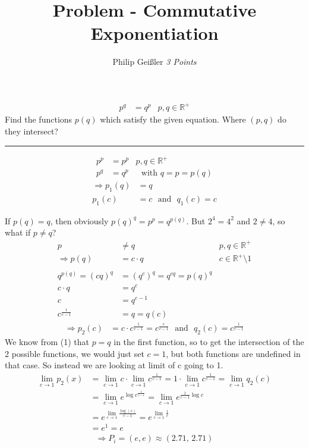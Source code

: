 \documentclass[12pt, a4paper]{article}
\newcommand{\rom}[1]{\uppercase\expandafter{\romannumeral #1\relax}}
\begin{document}
\title{Problem \rom{1} - Commutative Exponentiation}
\author{Philip Gei\ss{}ler \hspace{5cm} \textit{3 Points}}
\date{}
\maketitle
\vspace*{-.9cm}

\begin{align*}
p^q &= q^p & p,q\in\mathbb{R}^+
\end{align*}
Find the functions $p(q)$ which satisfy the given equation. Where $(p,q)$ do they intersect?
\hrule
\vspace*{9mm}

\begin{align*}
p^p &= p^p & p,q\in\mathbb{R}^+\\
p^q &= q^p &\text{~~with~} q = p = p(q)
\end{align*}
\vspace*{-1cm}
\begin{align}
\Rightarrow p_1(q) &= q\\
p_1(c) &= c \text{~~and~~} q_1(c) = c
\end{align}

If $p(q)=q$, then obviously $p(q)^q = p^p = q^{p(q)}$.
But $2^4 = 4^2$ and $2 \neq 4$, so what if $p \neq q$?
\begin{align*}
p &\neq q & p,q\in\mathbb{R}^+\\
\Rightarrow p(q) &= c\cdot q & c\in \mathbb{R}^+\setminus{1}\\~\\
q^{p(q)} = (cq)^q &= \left(q^c\right)^q= q^{cq} = p(q)^q\\
c\cdot q &= q^c\\
c &= q^{c-1}\\
c^\frac{1}{c-1} &= q = q(c)
\end{align*}
\vspace*{-1cm}
\begin{align}
\Rightarrow p_2(c) &= c\cdot c^\frac{1}{c-1} = c^\frac{c}{c-1}\text{~~and~~} q_2(c) = c^\frac{1}{c-1}
\end{align} 
We know from (1) that $p=q$ in the first function, so to get the intersection of the 2 possible functions, we would just set $c=1$, but both functions are undefined in that case. So instead we are looking at limit of c going to 1. 
\begin{align*}
\lim_{c\rightarrow 1} p_2(x) &= \lim_{c\rightarrow 1} c\cdot \lim_{c\rightarrow 1} c^\frac{1}{c-1} = 1 \cdot \lim_{c\rightarrow 1} c^\frac{1}{c-1} = \lim_{c\rightarrow 1} q_2(c)\\
& = \lim_{c\rightarrow 1} e^{\log{c^\frac{1}{c-1}}} = \lim_{c\rightarrow 1} e^{\frac{1}{c-1}\log{c}}\\
 &= e^{\lim\limits_{c\rightarrow 1} \frac{\log(c)}{c-1}} = e^{\lim\limits_{c\rightarrow 1} \frac{1}{c}}\\
 &= e^1 = e
\end{align*}
\begin{align}
\Rightarrow P_i = (e,e) \approx (2.71,\,2.71)
\end{align}
\end{document}
